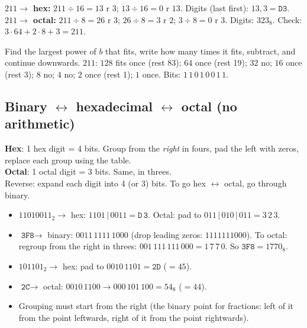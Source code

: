 \documentclass{fkt-notes}
\newcommand{\bsub}[2]{#1_{#2}}  %
\begin{document}
\noindent\textbf{$211\to$ hex:} $211\div16=13$ r $3$; $13\div16=0$ r $13$. Digits (last first): $13,3=\texttt{D3}$.
\textbf{$211\to$ octal:} $211\div8=26$ r $3$; $26\div8=3$ r $2$; $3\div8=0$ r $3$. Digits: $\bsub{323}{8}$.
Check: $3\cdot64+2\cdot8+3=211$. \checkmark

\begin{rulebox}[title={Alternative by hand: subtract powers of the base}]
  Find the largest power of $b$ that fits, write how many times it fits, subtract,
  and continue downwards. $211$: $128$ fits once (rest 83); $64$ once (rest 19); $32$ no;
  $16$ once (rest 3); $8$ no; $4$ no; $2$ once (rest 1); $1$ once.
  Bits: $1\,1\,0\,1\,0\,0\,1\,1$.
\end{rulebox}

\subsection{Binary $\leftrightarrow$ hexadecimal $\leftrightarrow$ octal (no arithmetic)}
\begin{rulebox}[title={Method: group the bits}]
  \textbf{Hex}: 1 hex digit = 4 bits. Group from the \emph{right} in fours, pad the left with zeros, replace each group using the table.\\
  \textbf{Octal}: 1 octal digit = 3 bits. Same, in threes.\\
  Reverse: expand each digit into 4 (or 3) bits. To go hex $\leftrightarrow$ octal, go through binary.
\end{rulebox}
\begin{itemize}
  \item $\bsub{11010011}{2}\to$ hex: $1101\,|\,0011=\texttt{D}\,\texttt{3}$. Octal: pad to $011\,|\,010\,|\,011=3\,2\,3$.
  \item $\texttt{3F8}\to$ binary: $0011\,1111\,1000$ (drop leading zeros: $1111111000$).
        To octal: regroup from the right in threes: $001\,111\,111\,000=1\,7\,7\,0$. So $\texttt{3F8}=\bsub{1770}{8}$.
  \item $\bsub{101101}{2}\to$ hex: pad to $0010\,1101=\texttt{2D}$ ($=45$).
  \item $\texttt{2C}\to$ octal: $0010\,1100\to 000\,101\,100=\bsub{54}{8}$ ($=44$).
  \item Grouping must start from the right (the binary point for fractions: left of it from the point leftwards, right of it from the point rightwards).
\end{itemize}
\end{document}
